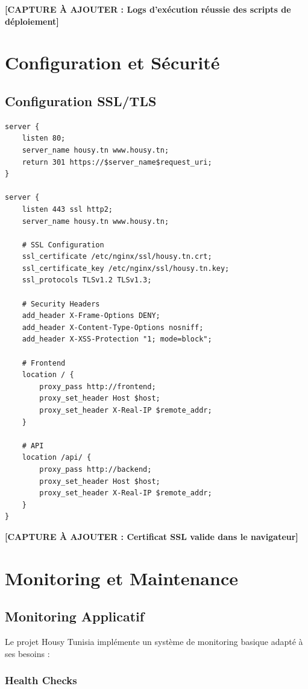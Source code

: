 \textbf{[CAPTURE À AJOUTER : Logs d'exécution réussie des scripts de déploiement]}

\section{Configuration et Sécurité}

\subsection{Configuration SSL/TLS}

\begin{lstlisting}[language=nginx, caption=Configuration Nginx avec SSL]
server {
    listen 80;
    server_name housy.tn www.housy.tn;
    return 301 https://$server_name$request_uri;
}

server {
    listen 443 ssl http2;
    server_name housy.tn www.housy.tn;

    # SSL Configuration
    ssl_certificate /etc/nginx/ssl/housy.tn.crt;
    ssl_certificate_key /etc/nginx/ssl/housy.tn.key;
    ssl_protocols TLSv1.2 TLSv1.3;

    # Security Headers
    add_header X-Frame-Options DENY;
    add_header X-Content-Type-Options nosniff;
    add_header X-XSS-Protection "1; mode=block";

    # Frontend
    location / {
        proxy_pass http://frontend;
        proxy_set_header Host $host;
        proxy_set_header X-Real-IP $remote_addr;
    }

    # API
    location /api/ {
        proxy_pass http://backend;
        proxy_set_header Host $host;
        proxy_set_header X-Real-IP $remote_addr;
    }
}
\end{lstlisting}

\textbf{[CAPTURE À AJOUTER : Certificat SSL valide dans le navigateur]}

\section{Monitoring et Maintenance}

\subsection{Monitoring Applicatif}

Le projet Housy Tunisia implémente un système de monitoring basique adapté à ses besoins :

\subsubsection{Health Checks}

